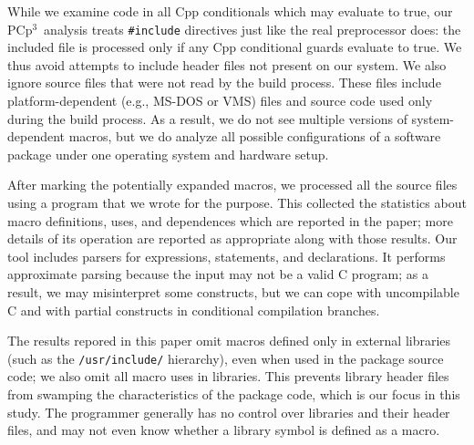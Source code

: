 \documentclass[10pt]{article}
\newcommand{\pcp}{\mbox{\textsf{PCp}$^3$}}
\newcommand{\file}[1]{\texttt{#1}}
\begin{document}
While we examine code in all Cpp conditionals which may evaluate to true,
our \pcp\ analysis treats {\tt \#include} directives just like the real
preprocessor does:  the included file is processed only if any Cpp
conditional guards evaluate to true.  We thus avoid attempts to include
header files not present on our system.  We also ignore source files that
were not read by the build process.  These files include platform-dependent
(e.g., MS-DOS or VMS) files and source code used only during the build
process.  As a result, we do not see multiple versions of system-dependent
macros, but we do analyze all possible configurations of a software package
under one operating system and hardware setup.







After marking the potentially expanded macros, we processed all the source
files using a program that we wrote for the purpose.  This collected the
statistics about macro definitions, uses, and dependences which are
reported in the paper; more details of its operation are reported as
appropriate along with those results.  Our tool includes parsers for
expressions, statements, and declarations.  It performs approximate parsing
because the input may not be a valid C program; as a result, we may
misinterpret some constructs, but we can cope with uncompilable C and with
partial constructs in conditional compilation branches.

The results repored in this paper omit macros defined only in external
libraries (such as the \file{/usr/include/} hierarchy), even when used in
the package source code; we also omit all macro uses in libraries.  This
prevents library header files from swamping the characteristics of the
package code, which is our focus in this study.  The programmer generally
has no control over libraries and their header files, and may not even know
whether a library symbol is defined as a macro.
\end{document}
